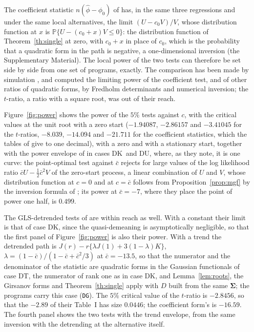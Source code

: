\documentclass[ecta,nameyear,final]{econsocart}
\newcommand{\PP}{{\mathbb P}}
\newcommand{\Fk}{\textsf{\upshape DK}}
\newcommand{\Fu}{\textsf{\upshape DU}}
\newcommand{\Ft}{\textsf{\upshape DT}}
\newcommand{\bSig}{\boldsymbol{\Sigma}}
\theoremstyle{plain}
\theoremstyle{definition}
\begin{document}
The coefficient statistic $n(\hat\phi-\phi_0)$ of \cite{DickeyFuller1979} has, in the same three regressions and under the same local alternatives, the limit $(U-c_0V)/V$, whose distribution function at $x$ is $\PP\{U-(c_0+x)V\le0\}$: the distribution function of Theorem~\ref{th:single} at zero, with $c_0+x$ in place of $c_0$, which is the probability that a quadratic form in the path is negative, a one-dimensional inversion (the Supplementary Material).  The local power of the two tests can therefore be set side by side from one set of programs, exactly.  The comparison has been made by simulation \citep{Phillips1987,Stock1994,ElliottRothenbergStock1996}, and \cite{NabeyaTanaka1990b} computed the limiting power of the coefficient test, and of other ratios of quadratic forms, by Fredholm determinants and numerical inversion; the $t$-ratio, a ratio with a square root, was out of their reach.

Figure~\ref{fig:power} shows the power of the $5\%$ tests against $c$, with the critical values at the unit root with a zero start ($-1.94087$, $-2.86157$ and $-3.41045$ for the $t$-ratios, $-8.039$, $-14.094$ and $-21.711$ for the coefficient statistics, which the tables of \cite{Fuller1996} give to one decimal), with a zero and with a stationary start, together with the power envelope of \cite{ElliottRothenbergStock1996} in cases \Fk\ and \Fu, where, as they note, it is one curve: the point-optimal test against $\bar c$ rejects for large values of the log likelihood ratio $\bar cU-\frac12\bar c^2V$ of the zero-start process, a linear combination of $U$ and $V$, whose distribution function at $c=0$ and at $c=\bar c$ follows from Proposition~\ref{prop:mgf} by the inversion formula of \cite{GilPelaez1951}; its power at $\bar c=-7$, where they place the point of power one half, is $0.499$.

The GLS-detrended tests of \cite{ElliottRothenbergStock1996} are within reach as well.  With a constant their limit is that of case \Fk, since the quasi-demeaning is asymptotically negligible, so that the first panel of Figure~\ref{fig:power} is also their power.  With a trend the detrended path is $J(r)-r\{\lambda J(1)+3(1-\lambda)K\}$, $\lambda=(1-\bar c)/(1-\bar c+\bar c^2/3)$ at $\bar c=-13.5$, so that the numerator and the denominator of the statistic are quadratic forms in the Gaussian functionals of case \Ft, the numerator of rank one as in case \Fk, and Lemma~\ref{lem:roots}, the Girsanov forms and Theorem~\ref{th:single} apply with $D$ built from the same $\bSig$; the programs carry this case (\texttt{DG}).  The $5\%$ critical value of the $t$-ratio is $-2.8456$, so that the $-2.89$ of their Table~I has size $0.0446$; the coefficient form's is $-16.59$.  The fourth panel shows the two tests with the trend envelope, from the same inversion with the detrending at the alternative itself.
\end{document}
